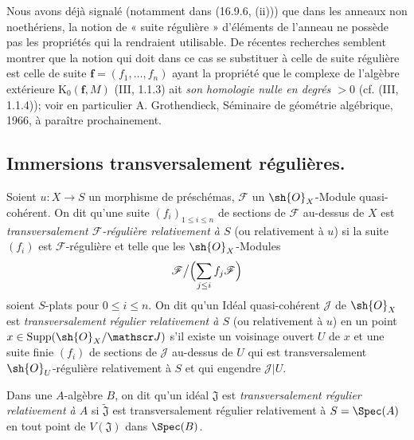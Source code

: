 \begin{env}[19.1.8]
\label{IV.19.1.8}
Nous avons déjà signalé (notamment dans (16.9.6, (ii))) que dans les anneaux non noethériens, la notion de « suite régulière » d'éléments de l'anneau ne possède pas les propriétés qui la rendraient utilisable. De récentes recherches semblent montrer que la notion qui doit dans ce cas se substituer à celle de suite régulière est celle de suite $\mathbf f=(f_1,\ldots,f_n)$ ayant la propriété que le complexe de l'algèbre extérieure $\mathrm K_0(\mathbf f,M)$ (III, 1.1.3) ait \emph{son homologie nulle en degrés $>0$} (cf. (III, 1.1.4)); voir en particulier A. Grothendieck, Séminaire de géométrie algébrique, 1966, à paraître prochainement.
\end{env}

\subsection{Immersions transversalement régulières.}
\label{subsection:IV.19.2}


\begin{definition}[19.2.1]
\label{IV.19.2.1}
Soient $u:X\to S$ un morphisme de préschémas, $\mathscr F$ un $\sh{O}_X$-Module quasi-cohérent. On dit qu'une suite $(f_i)_{1\leq i\leq n}$ de sections de $\mathscr F$ au-dessus de $X$ est \emph{transversalement $\mathscr F$-régulière relativement à $S$} (ou relativement à $u$) si la suite $(f_i)$ est $\mathscr F$-régulière et telle que les $\sh{O}_X$-Modules
\[
  \mathscr F\big/\Bigl(\sum_{j\leq i}f_j\mathscr F\Bigr)
\]
soient $S$-plats pour $0\leq i\leq n$. On dit qu'un Idéal quasi-cohérent $\mathscr J$ de $\sh{O}_X$ est \emph{transversalement régulier relativement à $S$} (ou relativement à $u$) en un point $x\in\operatorname{Supp}(\sh{O}_X/\mathscr J)$ s'il existe un voisinage ouvert $U$ de $x$ et une suite finie $(f_i)$ de sections de $\mathscr J$ au-dessus de $U$ qui est transversalement $\sh{O}_U$-régulière relativement à $S$ et qui engendre $\mathscr J|U$.

Dans une $A$-algèbre $B$, on dit qu'un idéal $\mathfrak J$ est \emph{transversalement régulier relativement à $A$} si $\widetilde{\mathfrak J}$ est transversalement régulier relativement à $S=\Spec(A)$ en tout point de $V(\mathfrak J)$ dans $\Spec(B)$.
\end{definition}

